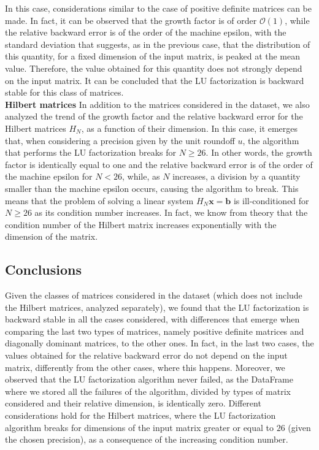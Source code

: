 \documentclass[a4paper,11pt]{article}
\begin{document}
\noindent In this case, considerations similar to the case of positive definite matrices can be made. In fact, it can be observed that the growth factor is of order $\mathcal{O}(1)$, while the relative backward error is of the order of the machine epsilon, with the standard deviation that suggests, as in the previous case, that the distribution of this quantity, for a fixed dimension of the input matrix, is peaked at the mean value. Therefore, the value obtained for this quantity does not strongly depend on the input matrix. It can be concluded that the LU factorization is backward stable for this class of matrices.\\

\noindent \textbf{Hilbert matrices} In addition to the matrices considered in the dataset, we also analyzed the trend of the growth factor and the relative backward error for the Hilbert matrices $H_{N}$, as a function of their dimension. In this case, it emerges that, when considering a precision given by the unit roundoff $u$, the algorithm that performs the LU factorization breaks for $N\ge26$. In other words, the growth factor is identically equal to one and the relative backward error is of the order of the machine epsilon for $N<26$, while, as $N$ increases, a division by a quantity smaller than the machine epsilon occurs, causing the algorithm to break. This means that the problem of solving a linear system $H_{N}\textbf{x}=\textbf{b}$ is ill-conditioned for $N\ge26$ as its condition number increases. In fact, we know from theory that the condition number of the Hilbert matrix increases exponentially with the dimension of the matrix.

\subsection{Conclusions}
Given the classes of matrices considered in the dataset (which does not include the Hilbert matrices, analyzed separately), we found that the LU factorization is backward stable in all the cases considered, with differences that emerge when comparing the last two types of matrices, namely positive definite matrices and diagonally dominant matrices, to the other ones. In fact, in the last two cases, the values obtained for the relative backward error do not depend on the input matrix, differently from the other cases, where this happens. Moreover, we observed that the LU factorization algorithm never failed, as the DataFrame where we stored all the failures of the algorithm, divided by types of matrix considered and their relative dimension, is identically zero. Different considerations hold for the Hilbert matrices, where the LU factorization algorithm breaks for dimensions of the input matrix greater or equal to $26$ (given the chosen precision), as a consequence of the increasing condition number.
\end{document}
